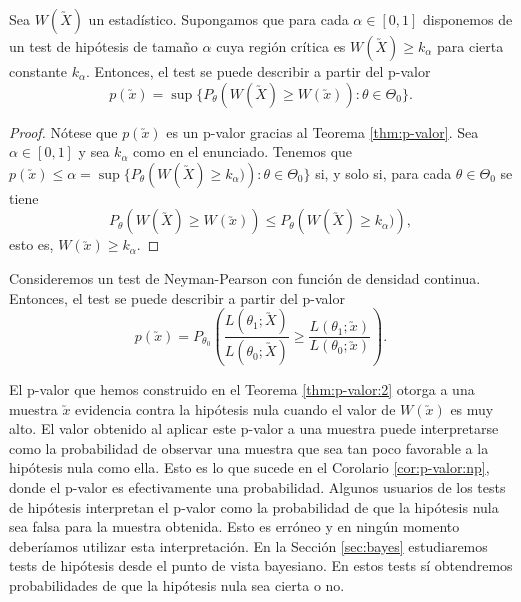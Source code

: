         \begin{thm} \label{thm:p-valor:2}
            Sea $W(\utilde{X})$ un estadístico. Supongamos que para cada $\alpha \in [0,1]$ disponemos de un test de hipótesis de tamaño $\alpha$ cuya región crítica es $W(\utilde{X}) \ge k_\alpha$ para cierta constante $k_\alpha$. Entonces, el test se puede describir a partir del p-valor
           \[p(\utilde{x}) = \sup\{P_{\theta}\left(W(\utilde{X}) \ge W(\utilde{x})\right): \theta \in \Theta_0\}.\]
       \end{thm}
        \begin{proof}
            Nótese que $p(\utilde{x})$ es un p-valor gracias al Teorema \ref{thm:p-valor}. Sea $\alpha \in [0,1]$ y sea $k_\alpha$ como en el enunciado. Tenemos que $p(\utilde{x}) \le \alpha = \sup\{P_{\theta}\left(W(\utilde{X}) \ge k_\alpha)\right): \theta \in \Theta_0\}$ si, y solo si, para cada $\theta \in \Theta_0$ se tiene
            \[P_{\theta}\left(W(\utilde{X}) \ge W(\utilde{x})\right) \le P_{\theta}\left(W(\utilde{X}) \ge k_\alpha)\right) ,\]
            esto es, $W(\utilde{x}) \ge k_\alpha$.
        \end{proof}

        \begin{cor} \label{cor:p-valor:np}
            Consideremos un test de Neyman-Pearson con función de densidad continua. Entonces, el test se puede describir a partir del p-valor
           \[p(\utilde{x}) = P_{\theta_0}\left(\frac{L(\theta_1;\utilde{X})}{L(\theta_0;\utilde{X})} \ge \frac{L(\theta_1;\utilde{x})}{L(\theta_0;\utilde{x})}\right).  \]
       \end{cor}

        El p-valor que hemos construido en el Teorema \ref{thm:p-valor:2} otorga a una muestra $\utilde{x}$ evidencia contra la hipótesis nula cuando el valor de $W(\utilde{x})$ es muy alto. El valor obtenido al aplicar este p-valor a una muestra puede interpretarse como la probabilidad de observar una muestra que sea tan poco favorable a la hipótesis nula como ella. Esto es lo que sucede en el Corolario \ref{cor:p-valor:np}, donde el p-valor es efectivamente una probabilidad. Algunos usuarios de los tests de hipótesis interpretan el p-valor como la probabilidad de que la hipótesis nula sea falsa para la muestra obtenida. Esto es erróneo y en ningún momento deberíamos utilizar esta interpretación. En la Sección \ref{sec:bayes} estudiaremos tests de hipótesis desde el punto de vista bayesiano. En estos tests sí obtendremos probabilidades de que la hipótesis nula sea cierta o no.

